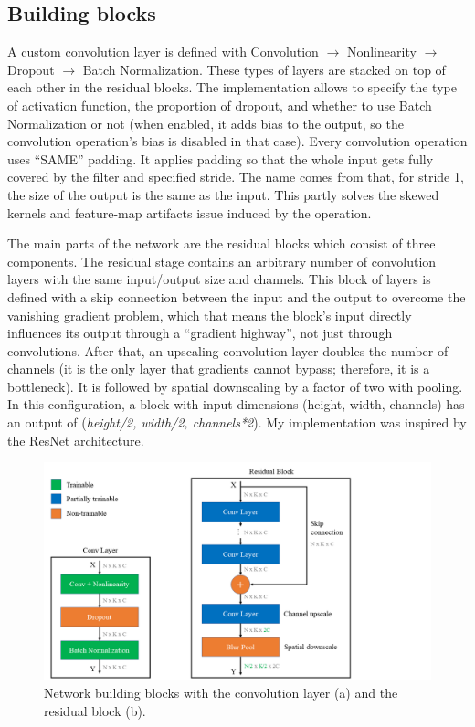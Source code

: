 \subsection{Building blocks}

A custom convolution layer is defined with Convolution $\rightarrow$ Nonlinearity $\rightarrow$ Dropout $\rightarrow$ Batch Normalization. These types of layers are stacked on top of each other in the residual blocks. The implementation allows to specify the type of activation function, the proportion of dropout, and whether to use Batch Normalization or not (when enabled, it adds bias to the output, so the convolution operation's bias is disabled in that case). Every convolution operation uses ``SAME'' padding. It applies padding so that the whole input gets fully covered by the filter and specified stride. The name comes from that, for stride 1, the size of the output is the same as the input. This partly solves the skewed kernels and feature-map artifacts issue induced by the operation\cite{PadBlindSpot}.

The main parts of the network are the residual blocks which consist of three components. The residual stage contains an arbitrary number of convolution layers with the same input/output size and channels. This block of layers is defined with a skip connection between the input and the output to overcome the vanishing gradient problem, which that means the block's input directly influences its output through a ``gradient highway'', not just through convolutions. After that, an upscaling convolution layer doubles the number of channels (it is the only layer that gradients cannot bypass; therefore, it is a bottleneck). It is followed by spatial downscaling by a factor of two with pooling. In this configuration, a block with input dimensions (height, width, channels) has an output of (\textit{height/2, width/2, channels*2}). My implementation was inspired by the ResNet\cite{ResNet} architecture.

\begin{figure}[htb]
 \centerline{\includegraphics[width=1.0\columnwidth]{.//Figure/OCR/Slide4.PNG}}
 \caption{Network building blocks with the convolution layer (a) and the residual block (b).}
 \label{fig:simple}
\end{figure}

